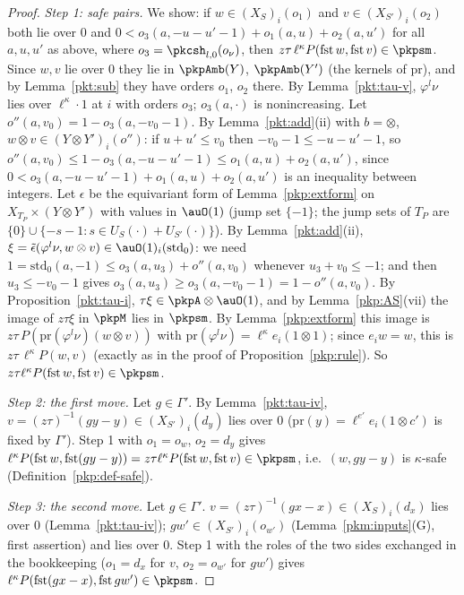 \documentclass[10pt]{amsart}
\theoremstyle{definition}
\theoremstyle{remark}
\begin{document}
\begin{proof}
\emph{Step 1: safe pairs.} We show: if $w\in(X_S)_i(o_1)$ and $v\in(X_{S'})_i(o_2)$ both lie over $0$ and
$0<o_3(a,-u-u'-1)+o_1(a,u)+o_2(a,u')$ for all $a,u,u'$ as above, where $o_3=\pkcsh_{l,0}(o_\nu)$, then
$z\tau\,\ell^\kappa P(\mathrm{fst}\,w,\mathrm{fst}\,v)\in\pkpsm$. Since $w,v$ lie over $0$ they lie in
$\pkpAmb(Y)$, $\pkpAmb(Y')$ (the kernels of $\mathrm{pr}$), and by Lemma~\ref{pkt:sub} they have orders $o_1$,
$o_2$ there. By
Lemma~\ref{pkt:tau-v}, $\varphi^l\nu$ lies over $\ell^\kappa\cdot1$ at $i$ with orders $o_3$; $o_3(a,\cdot)$ is
nonincreasing. Let $o''(a,v_0)=1-o_3(a,-v_0-1)$. By Lemma~\ref{pkt:add}(ii) with $b=\otimes$, $w\otimes v\in
(Y\otimes Y')_i(o'')$: if $u+u'\le v_0$ then $-v_0-1\le-u-u'-1$, so $o''(a,v_0)\le1-o_3(a,-u-u'-1)\le
o_1(a,u)+o_2(a,u')$, since $0<o_3(a,-u-u'-1)+o_1(a,u)+o_2(a,u')$ is an inequality between integers. Let $\epsilon$ be the equivariant form of
Lemma~\ref{pkp:extform} on $X_{T_P}\times(Y\otimes Y')$ with values in $\auO(1)$ (jump set $\{-1\}$; the jump
sets of $T_P$ are $\{0\}\cup\{-s-1:s\in U_S(\cdot)+U_{S'}(\cdot)\}$). By Lemma~\ref{pkt:add}(ii), $\xi=
\tilde\epsilon(\varphi^l\nu,w\otimes v)\in\auO(1)_i(\mathrm{std}_0)$: we need $1=\mathrm{std}_0(a,-1)\le o_3(a,u_3)+
o''(a,v_0)$ whenever $u_3+v_0\le-1$; and then $u_3\le-v_0-1$ gives $o_3(a,u_3)\ge o_3(a,-v_0-1)=1-o''(a,v_0)$.
By Proposition~\ref{pkt:tau-i}, $\tau\xi\in\pkpA\otimes\auO(1)$, and by Lemma~\ref{pkp:AS}(vii) the image of
$z\tau\xi$ in $\pkpM$ lies in $\pkpsm$. By Lemma~\ref{pkp:extform} this image is $z\tau\,P(\mathrm{pr}(\varphi^l
\nu)(w\otimes v))$ with $\mathrm{pr}(\varphi^l\nu)=\ell^\kappa e_i(1\otimes1)$; since $e_iw=w$, this is $z\tau\,\ell^\kappa P(w,v)$
(exactly as in the proof of Proposition~\ref{pkp:rule}). So $z\tau\ell^\kappa P(\mathrm{fst}\,w,
\mathrm{fst}\,v)\in\pkpsm$.

\emph{Step 2: the first move.} Let $g\in\Gamma'$. By Lemma~\ref{pkt:tau-iv}, $v=(z\tau)^{-1}(gy-y)\in(X_{S'})_i
(d_y)$ lies over $0$ ($\mathrm{pr}(y)=\ell^{e'}e_i(1\otimes c')$ is fixed by $\Gamma'$). Step 1 with $o_1=o_w$,
$o_2=d_y$ gives $\ell^\kappa P(\mathrm{fst}\,w,\mathrm{fst}(gy-y))=z\tau\ell^\kappa P(\mathrm{fst}\,w,\mathrm{fst}\,
v)\in\pkpsm$, i.e.\ $(w,gy-y)$ is $\kappa$-safe (Definition~\ref{pkp:def-safe}).

\emph{Step 3: the second move.} Let $g\in\Gamma'$. $v=(z\tau)^{-1}(gx-x)\in(X_S)_i(d_x)$ lies over $0$
(Lemma~\ref{pkt:tau-iv}); $gw'\in(X_{S'})_i(o_{w'})$ (Lemma~\ref{pkm:inputs}(G), first assertion) and lies
over $0$. Step 1 with the roles of the two sides exchanged in the bookkeeping ($o_1=d_x$ for $v$, $o_2=
o_{w'}$ for $gw'$) gives $\ell^\kappa P(\mathrm{fst}(gx-x),\mathrm{fst}\,gw')\in\pkpsm$.
\end{proof}
\end{document}
